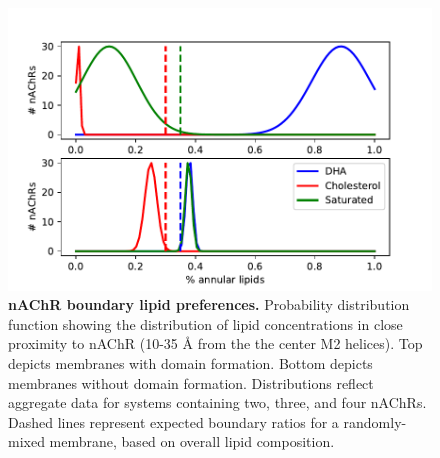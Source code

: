 \begin{figure}[h]
\centering
\includegraphics[width=.99\linewidth,trim={0cm 0cm 0cm 0.5cm}]{Figure1new}
\caption[nAChR boundary lipid preferences.]{{\bf nAChR boundary lipid preferences.} Probability distribution function showing the distribution of lipid concentrations in close proximity to nAChR (10-35 {\AA}  from the the center M2 helices). Top depicts membranes with domain formation. Bottom depicts membranes without domain formation. Distributions reflect aggregate data for systems containing two, three, and four nAChRs. Dashed lines represent expected boundary ratios for a randomly-mixed membrane, based on overall lipid composition.}
  \label{fig:Figure2}
\end{figure}









